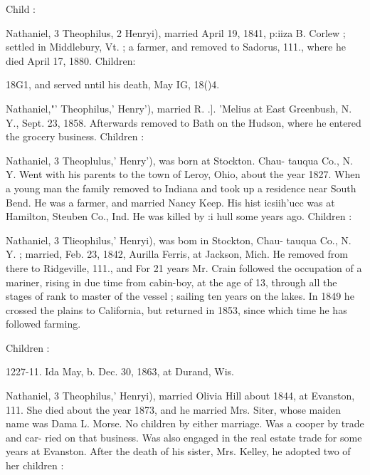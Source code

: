 \documentclass{book}
\begin{document}
Child : 


Nathaniel, 3 Theophilus, 2 Henryi), married April 19, 1841, p:iiza 
B. Corlew ; settled in Middlebury, Vt. ; a farmer, and removed 
to Sadorus, 111., where he died April 17, 1880. Children: 


18G1, and served nntil his death, May IG, 18()4. 


Nathaniel,"' Theophilus,' Henry'), married R. .]. 'Melius at East 
Greenbush, N. Y., Sept. 23, 1858. Afterwards removed to Bath 
on the Hudson, where he entered the grocery business. Children : 






Nathaniel, 3 Theoplulus,' Henry'), was born at Stockton. Chau- 
tauqua Co., N. Y. Went with his parents to the town of Leroy, 
Ohio, about the year 1827. When a young man the family 
removed to Indiana and took up a residence near South Bend. 
He was a farmer, and married Nancy Keep. His hist icsiih'ucc 
was at Hamilton, Steuben Co., Ind. He was killed by :i hull 
some years ago. Children : 









Nathaniel, 3 Tlieophilus,' Henryi), was bom in Stockton, Chau- 
tauqua Co., N. Y. ; married, Feb. 23, 1842, Aurilla Ferris, at 
Jackson, Mich. He removed from there to Ridgeville, 111., and 
For 21 years Mr. Crain followed the occupation of a mariner, 
rising in due time from cabin-boy, at the age of 13, through all 
the stages of rank to master of the vessel ; sailing ten years on 
the lakes. In 1849 he crossed the plains to California, but 
returned in 1853, since which time he has followed farming. 

Children : 













1227-11. Ida May, b. Dec. 30, 1863, at Durand, Wis. 



Nathaniel, 3 Theophilus,' Henryi), married Olivia Hill about 
1844, at Evanston, 111. She died about the year 1873, and he 
married Mrs. Siter, whose maiden name was Dama L. Morse. 
No children by either marriage. Was a cooper by trade and car- 
ried on that business. Was also engaged in the real estate trade 
for some years at Evanston. After the death of his sister, Mrs. 
Kelley, he adopted two of her children : 
\end{document}
